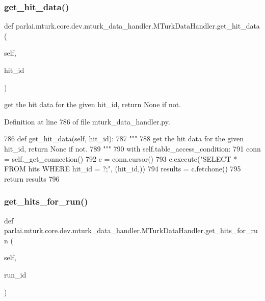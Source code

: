 \subsubsection{\texorpdfstring{get\+\_\+hit\+\_\+data()}{get\_hit\_data()}}
{\footnotesize\ttfamily def parlai.\+mturk.\+core.\+dev.\+mturk\+\_\+data\+\_\+handler.\+M\+Turk\+Data\+Handler.\+get\+\_\+hit\+\_\+data (\begin{DoxyParamCaption}\item[{}]{self,  }\item[{}]{hit\+\_\+id }\end{DoxyParamCaption})}

\begin{DoxyVerb}get the hit data for the given hit_id, return None if not.
\end{DoxyVerb}
 

Definition at line 786 of file mturk\+\_\+data\+\_\+handler.\+py.


\begin{DoxyCode}
786     \textcolor{keyword}{def }get\_hit\_data(self, hit\_id):
787         \textcolor{stringliteral}{"""}
788 \textcolor{stringliteral}{        get the hit data for the given hit\_id, return None if not.}
789 \textcolor{stringliteral}{        """}
790         with self.table\_access\_condition:
791             conn = self.\_get\_connection()
792             c = conn.cursor()
793             c.execute(\textcolor{stringliteral}{"SELECT * FROM hits WHERE hit\_id = ?;"}, (hit\_id,))
794             results = c.fetchone()
795             \textcolor{keywordflow}{return} results
796 
\end{DoxyCode}
\mbox{\label{classparlai_1_1mturk_1_1core_1_1dev_1_1mturk__data__handler_1_1MTurkDataHandler_a9effb9b4fadb19804787129f064f23a2}} 
\subsubsection{\texorpdfstring{get\+\_\+hits\+\_\+for\+\_\+run()}{get\_hits\_for\_run()}}
{\footnotesize\ttfamily def parlai.\+mturk.\+core.\+dev.\+mturk\+\_\+data\+\_\+handler.\+M\+Turk\+Data\+Handler.\+get\+\_\+hits\+\_\+for\+\_\+run (\begin{DoxyParamCaption}\item[{}]{self,  }\item[{}]{run\+\_\+id }\end{DoxyParamCaption})}

